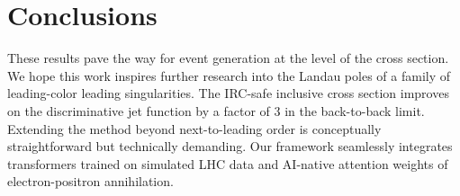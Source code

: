\section{Conclusions}\label{sec:conclusions}

These results pave the way for event generation at the level of the
cross section. We hope this work inspires further research into the
Landau poles of a family of leading-color leading singularities. The
IRC-safe inclusive cross section improves on the discriminative jet
function by a factor of 3 in the back-to-back limit. Extending the
method beyond next-to-leading order is conceptually straightforward but
technically demanding. Our framework seamlessly integrates transformers
trained on simulated LHC data and AI-native attention weights of
electron-positron annihilation.


